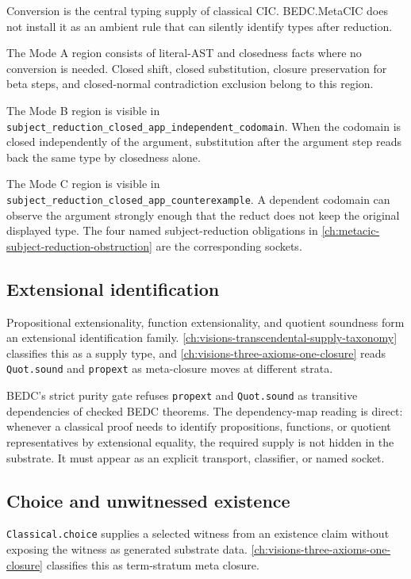 Conversion is the central typing supply of classical CIC. BEDC.MetaCIC does not install it as an ambient rule that can silently identify types after reduction.

The Mode A region consists of literal-AST and closedness facts where no conversion is needed. Closed shift, closed substitution, closure preservation for beta steps, and closed-normal contradiction exclusion belong to this region.

The Mode B region is visible in \texttt{subject\_reduction\_closed\_app\_independent\_codomain}. When the codomain is closed independently of the argument, substitution after the argument step reads back the same type by closedness alone.

The Mode C region is visible in \texttt{subject\_reduction\_closed\_app\_counterexample}. A dependent codomain can observe the argument strongly enough that the reduct does not keep the original displayed type. The four named subject-reduction obligations in \autoref{ch:metacic-subject-reduction-obstruction} are the corresponding sockets.

\subsection{Extensional identification}
\label{subsec:bedc-axiom-dependency-map-extensional-identification}

Propositional extensionality, function extensionality, and quotient soundness form an extensional identification family. \autoref{ch:visions-transcendental-supply-taxonomy} classifies this as a supply type, and \autoref{ch:visions-three-axioms-one-closure} reads \texttt{Quot.sound} and \texttt{propext} as meta-closure moves at different strata.

BEDC's strict purity gate refuses \texttt{propext} and \texttt{Quot.sound} as transitive dependencies of checked BEDC theorems. The dependency-map reading is direct: whenever a classical proof needs to identify propositions, functions, or quotient representatives by extensional equality, the required supply is not hidden in the substrate. It must appear as an explicit transport, classifier, or named socket.

\subsection{Choice and unwitnessed existence}
\label{subsec:bedc-axiom-dependency-map-choice}

\texttt{Classical.choice} supplies a selected witness from an existence claim without exposing the witness as generated substrate data. \autoref{ch:visions-three-axioms-one-closure} classifies this as term-stratum meta closure.

